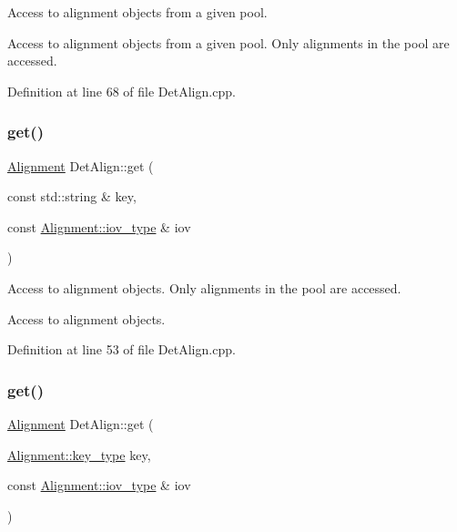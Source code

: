 Access to alignment objects from a given pool. 

Access to alignment objects from a given pool. Only alignments in the pool are accessed. 

Definition at line 68 of file Det\+Align.\+cpp.

\hypertarget{class_d_d4hep_1_1_alignments_1_1_det_align_aa009f405b4f76dadc3d6e8efae1f338d}{}\label{class_d_d4hep_1_1_alignments_1_1_det_align_aa009f405b4f76dadc3d6e8efae1f338d} 
\subsubsection{\texorpdfstring{get()}{get()}\hspace{0.1cm}{\footnotesize\ttfamily [3/4]}}
{\footnotesize\ttfamily \hyperlink{class_d_d4hep_1_1_alignments_1_1_alignment}{Alignment} Det\+Align\+::get (\begin{DoxyParamCaption}\item[{const std\+::string \&}]{key,  }\item[{const \hyperlink{class_d_d4hep_1_1_alignments_1_1_alignment_afd988c803da5a514d8fa255784f29462}{Alignment\+::iov\+\_\+type} \&}]{iov }\end{DoxyParamCaption})}



Access to alignment objects. Only alignments in the pool are accessed. 

Access to alignment objects. 

Definition at line 53 of file Det\+Align.\+cpp.

\hypertarget{class_d_d4hep_1_1_alignments_1_1_det_align_af0a58378d82a0076222f0b9b7327f524}{}\label{class_d_d4hep_1_1_alignments_1_1_det_align_af0a58378d82a0076222f0b9b7327f524} 
\subsubsection{\texorpdfstring{get()}{get()}\hspace{0.1cm}{\footnotesize\ttfamily [4/4]}}
{\footnotesize\ttfamily \hyperlink{class_d_d4hep_1_1_alignments_1_1_alignment}{Alignment} Det\+Align\+::get (\begin{DoxyParamCaption}\item[{\hyperlink{class_d_d4hep_1_1_alignments_1_1_alignment_ab824a65f935a0c79b9ea1a7a85014b88}{Alignment\+::key\+\_\+type}}]{key,  }\item[{const \hyperlink{class_d_d4hep_1_1_alignments_1_1_alignment_afd988c803da5a514d8fa255784f29462}{Alignment\+::iov\+\_\+type} \&}]{iov }\end{DoxyParamCaption})}



